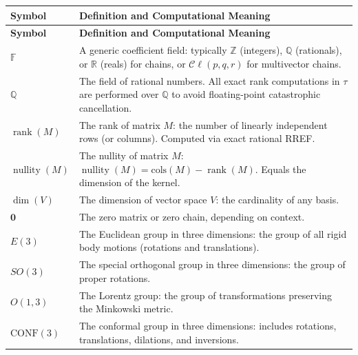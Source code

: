 \documentclass[manuscript, nonacm, review=false]{acmart}
\theoremstyle{definition}
\theoremstyle{plain}
\newcommand{\R}{\mathbb{R}}
\newcommand{\Z}{\mathbb{Z}}
\newcommand{\Q}{\mathbb{Q}}
\newcommand{\Cl}{\mathcal{C}\!\ell}
\newcommand{\F}{\mathbb{F}}
\newcommand{\rank}{\operatorname{rank}}
\newcommand{\nullity}{\operatorname{nullity}}
\newcommand{\toposLang}{\ensuremath{\tau}\text{-Lang}}
\begin{document}
\begin{longtable}{@{}p{2.8cm}p{10cm}@{}}
\toprule
\textbf{Symbol} & \textbf{Definition and Computational Meaning} \\
\midrule
\endfirsthead
\toprule
\textbf{Symbol} & \textbf{Definition and Computational Meaning} \\
\midrule
\endhead
\bottomrule
\endfoot

$\F$ & A generic coefficient field: typically $\Z$ (integers), $\Q$ (rationals), or $\R$ (reals) for chains, or $\Cl(p,q,r)$ for multivector chains. \\

$\Q$ & The field of rational numbers. All exact rank computations in \toposLang{} are performed over $\Q$ to avoid floating-point catastrophic cancellation. \\

$\rank(M)$ & The rank of matrix $M$: the number of linearly independent rows (or columns). Computed via exact rational RREF. \\

$\nullity(M)$ & The nullity of matrix $M$: $\nullity(M) = \text{cols}(M) - \rank(M)$. Equals the dimension of the kernel. \\

$\dim(V)$ & The dimension of vector space $V$: the cardinality of any basis. \\

$\mathbf{0}$ & The zero matrix or zero chain, depending on context. \\

$E(3)$ & The Euclidean group in three dimensions: the group of all rigid body motions (rotations and translations). \\

$SO(3)$ & The special orthogonal group in three dimensions: the group of proper rotations. \\

$O(1,3)$ & The Lorentz group: the group of transformations preserving the Minkowski metric. \\

$\text{CONF}(3)$ & The conformal group in three dimensions: includes rotations, translations, dilations, and inversions. \\

\end{longtable}


\end{document}
